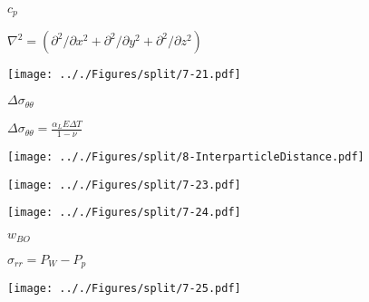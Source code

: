 \documentclass[onecolumn,11pt]{report}
\def\lthtmlcheckvsize{\ifdim\ht\sizebox<\vsize 
  \ifdim\wd\sizebox<\hsize\expandafter\hfill\fi \expandafter\vfill
  \else\expandafter\vss\fi}%
\begin{document}
{\newpage\clearpage
{}%
$ c_p$%
\lthtmlindisplaymathZ
\lthtmlcheckvsize\clearpage}

{\newpage\clearpage
{}%
$ \nabla^2=(\partial^2 / \partial x^2 + \partial^2 / \partial y^2 + \partial^2 / \partial z^2 )$%
\lthtmlindisplaymathZ
\lthtmlcheckvsize\clearpage}

{\newpage\clearpage
{}%
\texttt{[image: .././Figures/split/7-21.pdf]}%
\lthtmlpictureZ
\lthtmlcheckvsize\clearpage}

{\newpage\clearpage
{}%
$ \Delta \sigma_{\theta \theta}$%
\lthtmlindisplaymathZ
\lthtmlcheckvsize\clearpage}

{\newpage\clearpage
{}%
$\displaystyle \Delta \sigma_{\theta \theta} = \frac{\alpha_L E \Delta T}{1-\nu}$%
\lthtmlindisplaymathZ
\lthtmlcheckvsize\clearpage}

{\newpage\clearpage
{}%
\texttt{[image: .././Figures/split/8-InterparticleDistance.pdf]}%
\lthtmlpictureZ
\lthtmlcheckvsize\clearpage}

{\newpage\clearpage
{}%
\texttt{[image: .././Figures/split/7-23.pdf]}%
\lthtmlpictureZ
\lthtmlcheckvsize\clearpage}

{\newpage\clearpage
{}%
\texttt{[image: .././Figures/split/7-24.pdf]}%
\lthtmlpictureZ
\lthtmlcheckvsize\clearpage}

{\newpage\clearpage
{}%
$ w_{BO}$%
\lthtmlindisplaymathZ
\lthtmlcheckvsize\clearpage}

{\newpage\clearpage
{}%
$ \sigma_{rr} = P_W - P_p$%
\lthtmlindisplaymathZ
\lthtmlcheckvsize\clearpage}

{\newpage\clearpage
{}%
\texttt{[image: .././Figures/split/7-25.pdf]}%
\lthtmlpictureZ
\lthtmlcheckvsize\clearpage}
\end{document}
